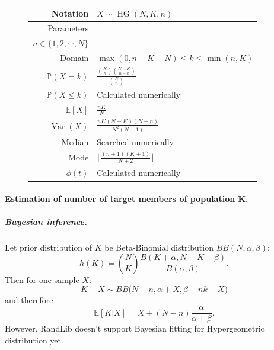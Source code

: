 \documentclass[a4paper,11pt]{article}
\theoremstyle{plain}
\theoremstyle{definition}
\newcommand{\ME}{\mathbb{E}}
\newcommand{\MP}{\mathbb{P}}
\newcommand{\MN}{\mathbb{N}}
\newcommand{\Var}{\operatorname{Var}}
\begin{document}
\begin{figure}[!htb]
\begin{minipage}{0.4\textwidth}
\begin{tabular}{| r | l |}
					\hline
					Notation & $ X \sim \operatorname{HG}(N, K, n) $ \\
					\hline
					Parameters & 
					\pbox{\linewidth}{$ N \in \MN, K \in \{1, 2, \dotsm, N  \},$ \\ $n \in \{1, 2, \dotsm, N  \}$} \\
					\hline
					Domain & $ \max(0, n+K-N) \leq k \leq \min(n, K) $  \\
					\hline
					$\MP(X = k)$ & $ \frac{\binom{K}{k}\binom{N-K}{n-k}  }{\binom{N}{n}}   $ \\
					\hline
					$\MP(X \leq k)$ & Calculated numerically \\
					\hline
					$\ME[X]$ & $ \frac{nK}{N}$ \\
					\hline
					$\Var(X)$ & $ \frac{nK(N-K)(N-n)}{N^2(N-1)} $ \\
					\hline
					Median & Searched numerically \\
					\hline
					Mode & $ \Big\lfloor  \frac{(n+1)(K+1)}{N+2} \Big\rfloor  $ \\
					\hline
					$\phi(t)$ & Calculated numerically \\
					\hline
				\end{tabular}
			\end{minipage}
		\end{figure}
		
	\paragraph{Estimation of number of target members of population K.}
	\subparagraph{Bayesian inference.}
	Let prior distribution of $K$ be Beta-Binomial distribution $BB(N, \alpha, \beta)$:
	\[
	h(K) = \binom{N}{K} \frac{B(K + \alpha, N - K + \beta)}{B(\alpha, \beta)}.
	\]
	Then for one sample $X$:
    \[
    K - X \sim BB\big(N - n, \alpha + X, \beta + nk - X \big)
    \]
    and therefore
    \[ 
    \mathbb{E}[K|X] = X + (N - n) \frac{\alpha}{\alpha + \beta}.
    \]
    However, RandLib doesn't support Bayesian fitting for Hypergeometric distribution yet.
    
   	\pagebreak
\end{document}
